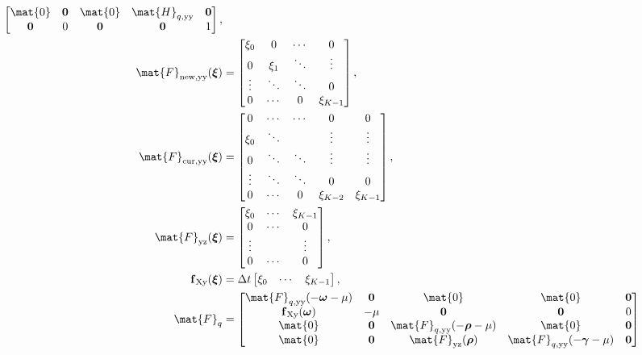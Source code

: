 \documentclass{jpmarticle}
\renewcommand{\vec}[1]{\boldsymbol{\mathrm{#1}}}
\let\subequationsorig\subequations%
\let\endsubequationsorig\endsubequations%
\renewenvironment{subequations}{
  \subequationsorig
  \renewcommand{\theequation}{\theparentequation.\arabic{equation}}
}{
  \endsubequationsorig
}
\begin{document}
\begin{subequations}
\begin{align}
\begin{bmatrix}
      \mat{0} & \vec{0} & \mat{0} & \mat{H}_{q, \mathrm{yy}} & \vec{0}
      \\
      \vec{0} & 0 & \vec{0} & \vec{0} & 1
    \end{bmatrix},
    \\
    \mat{F}_{\mathrm{new}, \mathrm{yy}}(\vec{\xi}) &=
    \begin{bmatrix}
      \xi_0 & 0 & \cdots & 0 \\
      0 & \xi_1 & \ddots & \vdots \\
      \vdots & \ddots & \ddots & 0 \\
      0 & \cdots & 0 & \xi_{K - 1}
    \end{bmatrix},
    \\
    \mat{F}_{\mathrm{cur}, \mathrm{yy}}(\vec{\xi}) &=
    \begin{bmatrix}
      0 & \cdots & \cdots & 0 & 0 \\
      \xi_0 & \ddots & & \vdots & \vdots \\
      0 & \ddots & \ddots & \vdots & \vdots \\
      \vdots & \ddots & \ddots & 0 & 0 \\
      0 & \cdots & 0 & \xi_{K - 2} & \xi_{K - 1}
    \end{bmatrix},
    \\
    \mat{F}_{\mathrm{yz}}(\vec{\xi}) &=
    \begin{bmatrix}
      \xi_0 & \cdots & \xi_{K - 1} \\
      0 & \cdots & 0 \\
      \vdots & & \vdots \\
      0 & \cdots & 0
    \end{bmatrix},
    \\
    \vec{f}_{\mathrm{Xy}}(\vec{\xi}) &=
    \Delta t
    \begin{bmatrix}
      \xi_0 & \cdots & \xi_{K - 1}
    \end{bmatrix},
    \\
    \mat{F}_q &=
    \begin{bmatrix}
      \mat{F}_{q, \mathrm{yy}}(- \vec{\omega} - \mu) & \vec{0} & \mat{0}
      & \mat{0} & \vec{0}
      \\
      \vec{f}_{\mathrm{Xy}}(\vec{\omega}) & - \mu & \vec{0} & \vec{0} & 0
      \\
      \mat{0} & \vec{0} & \mat{F}_{q, \mathrm{yy}}(- \vec{\rho} - \mu)
      & \mat{0} & \vec{0}
      \\
      \mat{0} & \vec{0} & \mat{F}_{\mathrm{yz}}(\vec{\rho})
      & \mat{F}_{q, \mathrm{yy}}(- \vec{\gamma} - \mu) & \vec{0}

\end{bmatrix}
\end{align}
\end{subequations}
\end{document}
